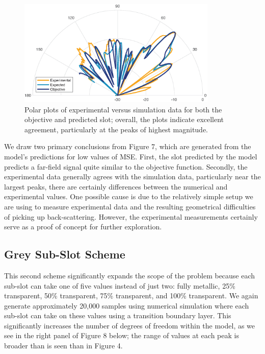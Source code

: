 \documentclass[11pt]{article}
\begin{document}
\begin{figure}[H]
	\centering
	\includegraphics[height=2in]{figures/477exp.eps}
	\caption{Polar plots of experimental versus simulation data for both the objective and predicted slot; overall, the plots indicate excellent agreement, particularly at the peaks of highest magnitude.}
\end{figure}

\noindent We draw two primary conclusions from Figure 7, which are generated from the model's predictions for low values of MSE. First, the slot predicted by the model predicts a far-field signal quite similar to the objective function. Secondly, the experimental data generally agrees with the simulation data, particularly near the largest peaks, there are certainly differences between the numerical and experimental values. One possible cause is due to the relatively simple setup we are using to measure experimental data and the resulting geometrical difficulties of picking up back-scattering. However, the experimental measurements certainly serve as a proof of concept for further exploration.

\subsection*{Grey Sub-Slot Scheme}

\noindent This second scheme significantly expands the scope of the problem because each sub-slot can take one of five values instead of just two: fully metallic, 25\% transparent, 50\% transparent, 75\% transparent, and 100\% transparent. We again generate approximately 20,000 samples using numerical simulation where each sub-slot can take on these values using a transition boundary layer. This significantly increases the number of degrees of freedom within the model, as we see in the right panel of Figure 8 below; the range of values at each peak is broader than is seen than in Figure 4.
\end{document}
